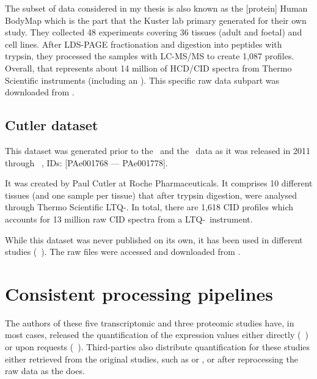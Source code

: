 The subset of data considered in my thesis is also
known as the [protein] Human BodyMap which is the part that the Kuster lab
primary generated for their own study. They collected 48 experiments covering 36
tissues (adult and foetal) and cell lines. After \gls{LDS-PAGE} fractionation and
digestion into peptides with trypsin, they processed the samples with
\gls{LC-MS/MS} to create 1,087 profiles.  Overall, that represents about
14 million of \gls{HCD}/\gls{CID} spectra from Thermo Scientific instruments
(including an \orbi).
This specific raw data subpart was downloaded from .\mybr\

\subsection{Cutler dataset}\label{subsec:cutler}

This dataset was generated prior to the \pandey\ and the \kuster\
data as it was released in 2011 through
~,
IDs: [PAe001768 --- PAe001778].\mybr\

It was created by Paul Cutler at Roche Pharmaceuticals.
It comprises 10 different tissues (and one sample per tissue) that after trypsin
digestion, were analysed through Thermo Scientific \gls{LTQ}-\orbi.
In total, there are 1,618 \gls{CID} profiles which accounts for 13 million raw
\gls{CID} spectra from a \gls{LTQ}-\orbi\ instrument.\mybr\

While this dataset was never published on its own, it has been used in different
studies (\eg~\cite{KusterData}).
The raw files were accessed and downloaded from .\mybr\


\section{Consistent processing pipelines}

The authors of these five transcriptomic and three proteomic studies have,
in most cases,
released the quantification of the expression values either directly
(\eg~\cite{Krupp2012}) or upon requests (\eg~\cite{PandeyData}).
Third-parties also distribute
quantification for these studies either retrieved from the original studies,
such as \hFoCi{BioGPS}{http://biogps.org/}{BioGPS1} or
,
or after reprocessing the raw data as
the  does.\mybr\

